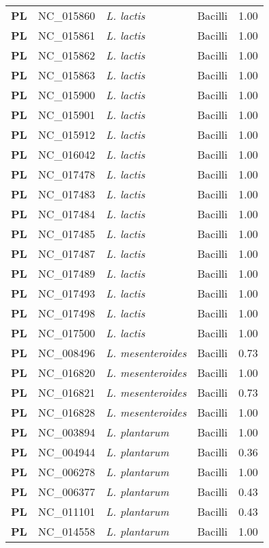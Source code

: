 \begin{adjustwidth}{-3cm}{2cm}
{\begin{supertabular}{>{\bfseries}l|p{0.1\textwidth}p{0.14\textwidth}l|l}
PL & NC\_015860 & \textit{L. lactis} & Bacilli & 1.00\\
PL & NC\_015861 & \textit{L. lactis} & Bacilli & 1.00\\
PL & NC\_015862 & \textit{L. lactis} & Bacilli & 1.00\\
PL & NC\_015863 & \textit{L. lactis} & Bacilli & 1.00\\
PL & NC\_015900 & \textit{L. lactis} & Bacilli & 1.00\\
PL & NC\_015901 & \textit{L. lactis} & Bacilli & 1.00\\
PL & NC\_015912 & \textit{L. lactis} & Bacilli & 1.00\\
PL & NC\_016042 & \textit{L. lactis} & Bacilli & 1.00\\
PL & NC\_017478 & \textit{L. lactis} & Bacilli & 1.00\\
PL & NC\_017483 & \textit{L. lactis} & Bacilli & 1.00\\
PL & NC\_017484 & \textit{L. lactis} & Bacilli & 1.00\\
PL & NC\_017485 & \textit{L. lactis} & Bacilli & 1.00\\
PL & NC\_017487 & \textit{L. lactis} & Bacilli & 1.00\\
PL & NC\_017489 & \textit{L. lactis} & Bacilli & 1.00\\
PL & NC\_017493 & \textit{L. lactis} & Bacilli & 1.00\\
PL & NC\_017498 & \textit{L. lactis} & Bacilli & 1.00\\
PL & NC\_017500 & \textit{L. lactis} & Bacilli & 1.00\\
PL & NC\_008496 & \textit{L. mesenteroides} & Bacilli & 0.73\\
PL & NC\_016820 & \textit{L. mesenteroides} & Bacilli & 1.00\\
PL & NC\_016821 & \textit{L. mesenteroides} & Bacilli & 0.73\\
PL & NC\_016828 & \textit{L. mesenteroides} & Bacilli & 1.00\\
PL & NC\_003894 & \textit{L. plantarum} & Bacilli & 1.00\\
PL & NC\_004944 & \textit{L. plantarum} & Bacilli & 0.36\\
PL & NC\_006278 & \textit{L. plantarum} & Bacilli & 1.00\\
PL & NC\_006377 & \textit{L. plantarum} & Bacilli & 0.43\\
PL & NC\_011101 & \textit{L. plantarum} & Bacilli & 0.43\\
PL & NC\_014558 & \textit{L. plantarum} & Bacilli & 1.00\\

\end{supertabular}}
\end{adjustwidth}
